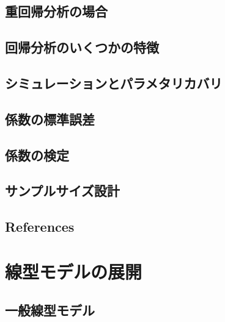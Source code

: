 \documentclass[
  a4paper,
]{ltjsbook}
\begin{document}
\section{重回帰分析の場合}\label{ux91cdux56deux5e30ux5206ux6790ux306eux5834ux5408}

\section{回帰分析のいくつかの特徴}\label{ux56deux5e30ux5206ux6790ux306eux3044ux304fux3064ux304bux306eux7279ux5fb4}

\section{シミュレーションとパラメタリカバリ}\label{ux30b7ux30dfux30e5ux30ecux30fcux30b7ux30e7ux30f3ux3068ux30d1ux30e9ux30e1ux30bfux30eaux30abux30d0ux30ea}

\section{係数の標準誤差}\label{ux4fc2ux6570ux306eux6a19ux6e96ux8aa4ux5dee}

\section{係数の検定}\label{ux4fc2ux6570ux306eux691cux5b9a}

\section{サンプルサイズ設計}\label{ux30b5ux30f3ux30d7ux30ebux30b5ux30a4ux30baux8a2dux8a08}

\section{References}\label{references-4}



\chapter{線型モデルの展開}\label{ux7ddaux578bux30e2ux30c7ux30ebux306eux5c55ux958b}

\section{一般線型モデル}\label{ux4e00ux822cux7ddaux578bux30e2ux30c7ux30eb}
\end{document}

